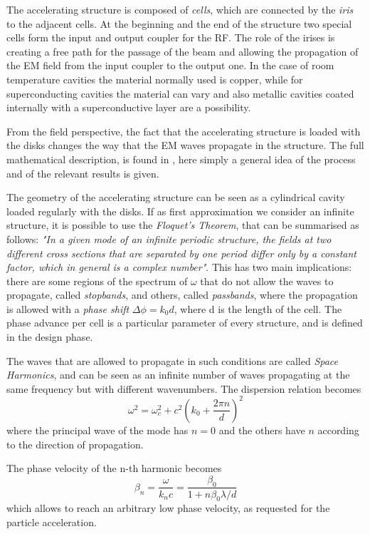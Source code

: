 The accelerating structure is composed of \textit{cells}, which are connected by the \textit{iris} to the adjacent cells. At the beginning and the end of the structure two special cells form the input and output coupler for the RF. The role of the irises is creating a free path for the passage of the beam and allowing the propagation of the EM field from the input coupler to the output one. In the case of room temperature cavities the material normally used is copper, while for superconducting cavities the material can vary and also metallic cavities coated internally with a superconductive layer are a possibility.

From the field perspective, the fact that the accelerating structure is loaded with the disks changes the way that the EM waves propagate in the structure. The full mathematical description, is found in \cite{ Jackson:ClassEM,Weiss:261732}, here simply a general idea of the process and of the relevant results is given.

The geometry of the accelerating structure can be seen as a cylindrical cavity loaded regularly with the disks. If as first approximation we consider an infinite structure, it is possible to use the \textit{Floquet's Theorem}, that can be summarised as follows: \textit{"In a given mode of an infinite periodic structure, the fields at two different cross sections that are separated by one period differ only by a constant factor, which in general is a complex number"}. This has two main implications: there are some regions of the spectrum of $\omega$ that do not allow the waves to propagate, called \textit{stopbands}, and others, called \textit{passbands}, where the propagation is allowed with a \textit{phase shift} $\Delta \phi = k_0 d$, where d is the length of the cell. The phase advance per cell is a particular parameter of every structure, and is defined in the design phase.

The waves that are allowed to propagate in such conditions are called \textit{Space Harmonics}, and can be seen as an infinite number of waves propagating at the same frequency but with different wavenumbers. The dispersion relation becomes
\begin{equation}
\omega ^2 = \omega^2_c + c^2 \left( k_0 + \frac{2\pi n}{d} \right)^2
\end{equation}
where the principal wave of the mode has $n=0$ and the others have $n$ according to the direction of propagation.

The phase velocity of the n-th harmonic becomes
\begin{equation}
\beta_n = \frac{\omega}{k_n c} = \frac{\beta_0}{1+n\beta_0 \lambda/d}
\end{equation}
which allows to reach an arbitrary low phase velocity, as requested for the particle acceleration.

